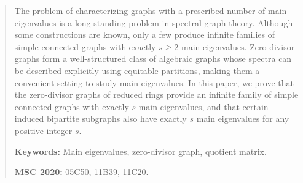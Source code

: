 \documentclass[11pt,oneside]{article}
\theoremstyle{plain}
\theoremstyle{plain}
\theoremstyle{definition}
\numberwithin{figure}{section}
\theoremstyle{remark}
\numberwithin{equation}{section}
\begin{document}
	
	\begin{abstract}
		The problem of characterizing graphs with a prescribed number of main eigenvalues is a long-standing problem in spectral graph theory. Although some constructions are known, only a few produce infinite families of simple connected graphs with exactly $s \ge 2$ main eigenvalues. Zero-divisor graphs form a well-structured class of algebraic graphs whose spectra can be described explicitly using equitable partitions, making them a convenient setting to study main eigenvalues. In this paper, we prove that the zero-divisor graphs of reduced rings provide an infinite family of simple connected graphs with exactly $s$ main eigenvalues, and that certain induced bipartite subgraphs also have exactly $s$ main eigenvalues for any positive integer $s$.
		
		
		
		
		\medskip
		\noindent\textbf{Keywords:} Main eigenvalues, zero-divisor graph, quotient matrix.
		
		\medskip
		\noindent\textbf{MSC 2020:} 05C50, 11B39, 11C20.
	\end{abstract}
	
\end{document}
